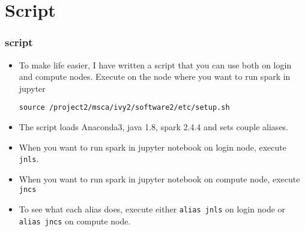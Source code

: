 \documentclass{beamer}
\begin{document}
\section{Script}
\begin{frame}[fragile]
  \frametitle{script}

  \begin{itemize}  
  \item To make life easier, I have written a script that you can use both on login and compute nodes. Execute on the node where you want to run spark in jupyter 
    {\color{mycolorcli}
      {\tiny
\begin{verbatim}
source /project2/msca/ivy2/software2/etc/setup.sh
\end{verbatim}
      }
    }
  \item The script loads Anaconda3, java 1.8, spark 2.4.4 and sets couple aliases.
  \item When you want to run spark in jupyter notebook on login node, execute {\color{mycolorcli}\verb|jnls|}.
  \item When you want to run spark in jupyter notebook 
    on compute node, execute {\color{mycolorcli}\verb|jncs|}
  \item To see what each alias does, execute either {\color{mycolorcli}\verb|alias jnls|} on login node or {\color{mycolorcli}\verb|alias jncs|} on compute node.
  \end{itemize}
  \end{frame}

    
\end{document}
